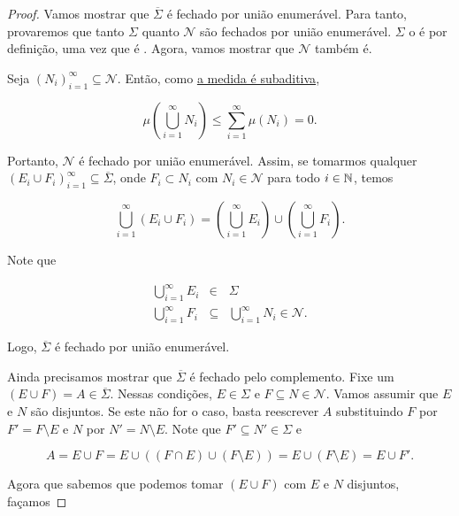 \begin{proof}
    Vamos mostrar que $\overline{\Sigma}$ é fechado por união enumerável. Para tanto, provaremos que tanto $\Sigma$ quanto $\mathcal{N}$ são fechados por união enumerável. $\Sigma$ o é por definição, uma vez que é \sigmaAlg. Agora, vamos mostrar que $\mathcal{N}$ também é. 

    Seja $(N_i)_{i=1}^{\infty}\subseteq \mathcal{N}$. Então, como \hyperref[prop:measure_is_subadditive]{a medida é subaditiva},

    \begin{equation*}
        \mu\left(\bigcup_{i=1}^{\infty} N_i\right) \leq \sum_{i=1}^{\infty} \mu(N_i) = 0.
    \end{equation*}

    Portanto, $\mathcal{N}$ é fechado por união enumerável. Assim, se tomarmos qualquer $(E_i\cup F_i)_{i=1}^{\infty}\subseteq \overline{\Sigma}$, onde $F_i\subset N_i$ com $N_i\in \mathcal{N}$ para todo $i\in\mathbb{N}$, temos

    \begin{equation*}
        \bigcup_{i=1}^{\infty} \left(E_i\cup F_i\right) = \left(\bigcup_{i=1}^{\infty} E_i\right) \cup \left(\bigcup_{i=1}^{\infty} F_i\right).
    \end{equation*}

    Note que

    \begin{eqnarray*}
        \bigcup_{i=1}^{\infty} E_i &\in& \Sigma\\
        \bigcup_{i=1}^{\infty} F_i&\subseteq& \bigcup_{i=1}^{\infty} N_i \in \mathcal{N}.
    \end{eqnarray*}

    Logo, $\overline{\Sigma}$ é fechado por união enumerável.

    Ainda precisamos mostrar que $\overline{\Sigma}$ é fechado pelo complemento. Fixe um $(E\cup F) = A \in \overline{\Sigma}$. Nessas condições, $E\in\Sigma$ e $F\subseteq N\in \mathcal{N}$. Vamos assumir que $E$ e $N$ são disjuntos. Se este não for o caso, basta reescrever $A$ substituindo $F$ por $F'=F\setminus E$ e $N$ por $N'=N\setminus E$. Note que $F'\subseteq N'\in \Sigma$ e 
    
    \begin{equation*}
        A = E \cup F = E \cup ((F\cap E) \cup (F\setminus E)) = E \cup (F\setminus E)=E\cup F'.
    \end{equation*}

    Agora que sabemos que podemos tomar $(E\cup F)$ com $E$ e $N$ disjuntos, façamos


\end{proof}
